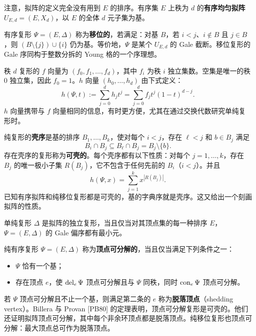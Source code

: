 注意，拟阵的定义完全没有用到 $E$ 的排序。有序集 $E$ 上秩为 $d$ 的\textbf{有序均匀拟阵} $U_{E,d}=(E,X_d)$，以 $E$ 的全体 $d$ 元子集为基。

有序复形 $\Psi=(E,\Delta)$ 称为\textbf{移位的}，若满足：对基 $B$，若 $i<j$、$i\notin B$ 且 $j\in B$，则 $(B\setminus\{j\})\cup\{i\}$ 仍为基。等价地，$\Psi$ 是某个 $U_{E,d}$ 的 Gale 截断。移位复形的 Gale 序同构于整数分拆的 Young 格的一个序理想。

秩 $d$ 复形的 $f$ 向量为 $(f_0,f_1,\ldots,f_d)$，其中 $f_i$ 为秩 $i$ 独立集数。空集是唯一的秩 0 独立集，因此 $f_0=1$。$h$ 向量 $(h_0,\ldots,h_d)$ 由下式定义：
\begin{equation}
h(\Psi,t):=\sum_{j=0}^d h_jt^j=\sum_{j=0}^d f_jt^j(1-t)^{d-j}.\tag{1}
\end{equation}
$h$ 向量携带与 $f$ 向量相同的信息，有时更方便，尤其在通过交换代数研究单纯复形时。

纯复形的\textbf{壳序}是基的排序 $B_1,\ldots,B_k$，使对每个 $i<j$，存在 $\ell<j$ 和 $b\in B_j$ 满足
\[
B_i\cap B_j\subseteq B_\ell\cap B_j=B_j\setminus\{b\}.
\]
存在壳序的复形称为\textbf{可壳的}。每个壳序都有以下性质：对每个 $j=1,\ldots,k$，存在 $B_j$ 的唯一极小子集 $R(B_j)$，它不包含于任何先前的 $B_i$（$i<j$）。并且
\begin{equation}
h(\Psi,x)=\sum_{j=1}^k x^{|R(B_j)|}.\tag{2}
\end{equation}
已知有序拟阵和纯移位复形都是可壳的，基的字典序就是壳序。这又给出一个刻画拟阵的性质。

单纯复形 $\Delta$ 是拟阵的独立复形，当且仅当对其顶点集的每一种排序 $E$，$\Psi=(E,\Delta)$ 的 Gale 偏序都有最小元。

纯有序复形 $\Psi=(E,\Delta)$ 称为\textbf{顶点可分解的}，当且仅当满足下列条件之一：
\begin{itemize}
\item $\Psi$ 恰有一个基；
\item 存在顶点 $e$，使 $\operatorname{del}_e\Psi$ 顶点可分解且与 $\Psi$ 同秩，同时 $\operatorname{con}_e\Psi$ 顶点可分解。
\end{itemize}
若 $\Psi$ 顶点可分解且不止一个基，则满足第二条的 $e$ 称为\textbf{脱落顶点}（shedding vertex）。Billera 与 Provan [PB80] 的定理表明，顶点可分解复形是可壳的。他们还证明拟阵顶点可分解，其中每个非余环顶点都是脱落顶点。纯移位复形也顶点可分解：最大顶点总可作为脱落顶点。

